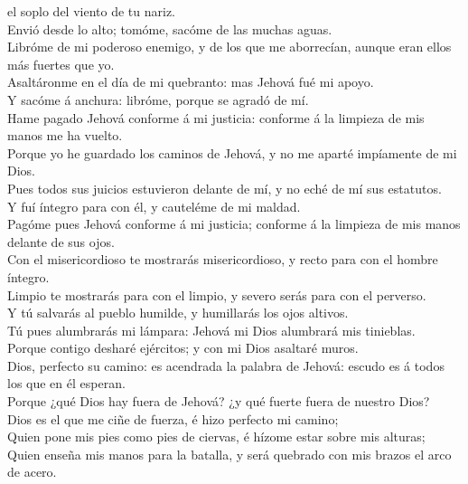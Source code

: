 el soplo del viento de tu nariz.\\
 Envió desde lo alto; tomóme, sacóme de las muchas
aguas.\\
 Libróme de mi poderoso enemigo, y de los que me
aborrecían, aunque eran ellos más fuertes que yo.\\
 Asaltáronme en el día de mi quebranto: mas Jehová fué mi
apoyo.\\
 Y sacóme á anchura: libróme, porque se agradó de mí.\\
 Hame pagado Jehová conforme á mi justicia: conforme á la
limpieza de mis manos me ha vuelto.\\
 Porque yo he guardado los caminos de Jehová, y no me
aparté impíamente de mi Dios.\\
 Pues todos sus juicios estuvieron delante de mí, y no
eché de mí sus estatutos.\\
 Y fuí íntegro para con él, y cauteléme de mi maldad.\\
 Pagóme pues Jehová conforme á mi justicia; conforme á la
limpieza de mis manos delante de sus ojos.\\
 Con el misericordioso te mostrarás misericordioso, y
recto para con el hombre íntegro.\\
 Limpio te mostrarás para con el limpio, y severo serás
para con el perverso.\\
 Y tú salvarás al pueblo humilde, y humillarás los ojos
altivos.\\
 Tú pues alumbrarás mi lámpara: Jehová mi Dios alumbrará
mis tinieblas.\\
 Porque contigo desharé ejércitos; y con mi Dios asaltaré
muros.\\
 Dios, perfecto su camino: es acendrada la palabra de
Jehová: escudo es á todos los que en él esperan.\\
 Porque ¿qué Dios hay fuera de Jehová? ¿y qué fuerte
fuera de nuestro Dios?\\
 Dios es el que me ciñe de fuerza, é hizo perfecto mi
camino;\\
 Quien pone mis pies como pies de ciervas, é hízome estar
sobre mis alturas;\\
 Quien enseña mis manos para la batalla, y será quebrado
con mis brazos el arco de acero.\\

